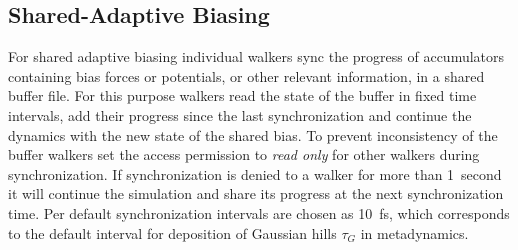 \subsection{Shared-Adaptive Biasing}
For shared adaptive biasing individual walkers sync the progress of accumulators containing bias forces or potentials, or other relevant information, in a shared buffer file.
For this purpose walkers read the state of the buffer in fixed time intervals, add their progress since the last synchronization and continue the dynamics with the new state of the shared bias.
To prevent inconsistency of the buffer walkers set the access permission to \textit{read only} for other walkers during synchronization.
If synchronization is denied to a walker for more than 1~second it will continue the simulation and share its progress at the next synchronization time.
Per default synchronization intervals are chosen as 10~fs, which corresponds to the default interval for deposition of Gaussian hills $\tau_G$ in metadynamics.
\newpage
